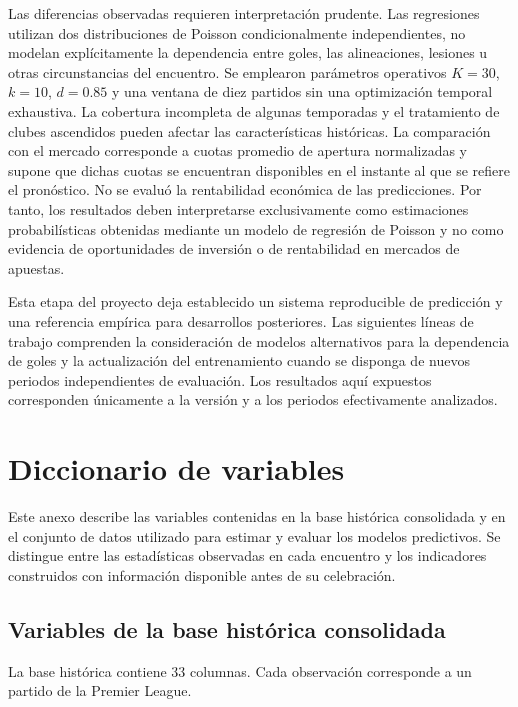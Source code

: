 \documentclass[11pt,a4paper]{article}
\begin{document}
Las diferencias observadas requieren interpretación prudente. Las regresiones utilizan dos distribuciones de Poisson condicionalmente independientes, no modelan explícitamente la dependencia entre goles, las alineaciones, lesiones u otras circunstancias del encuentro. Se emplearon parámetros operativos $K=30$, $k=10$, $d=0.85$ y una ventana de diez partidos sin una optimización temporal exhaustiva. La cobertura incompleta de algunas temporadas y el tratamiento de clubes ascendidos pueden afectar las características históricas. La comparación con el mercado corresponde a cuotas promedio de apertura normalizadas y supone que dichas cuotas se encuentran disponibles en el instante al que se refiere el pronóstico. No se evaluó la rentabilidad económica de las predicciones. Por tanto, los resultados deben interpretarse exclusivamente como estimaciones probabilísticas obtenidas mediante un modelo de regresión de Poisson y no como evidencia de oportunidades de inversión o de rentabilidad en mercados de apuestas.

Esta etapa del proyecto deja establecido un sistema reproducible de predicción y una referencia empírica para desarrollos posteriores. Las siguientes líneas de trabajo comprenden la consideración de modelos alternativos para la dependencia de goles y la actualización del entrenamiento cuando se disponga de nuevos periodos independientes de evaluación. Los resultados aquí expuestos corresponden únicamente a la versión y a los periodos efectivamente analizados.


\newpage
\appendix
\section{Diccionario de variables}

Este anexo describe las variables contenidas en la base histórica
consolidada y en el conjunto de datos utilizado para estimar y
evaluar los modelos predictivos. Se distingue entre las estadísticas
observadas en cada encuentro y los indicadores construidos con
información disponible antes de su celebración.

\newcommand{\campo}[1]{\texttt{\detokenize{#1}}}

\subsection{Variables de la base histórica consolidada}

La base histórica \campo{E0_consolidado.csv} contiene
33 columnas. Cada observación corresponde a un partido de la
Premier League.
\end{document}

